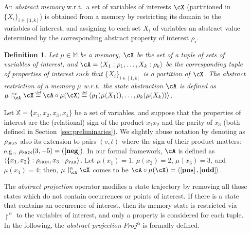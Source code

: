 \documentclass[prodmode,acmtocl]{acmsmall}
\newcommand{\caX}{\cX}
\def\variables{\ensuremath{\mathbb{X}}\xspace}
\def\memory{\ensuremath{\mu}\xspace}
\def\memories{\ensuremath{\mathbb{M}}\xspace}
\def\uco{\ensuremath{\rho}\xspace}
\def\ABSMEMop{\upharpoonright^\alpha}
\newcommand{\ABSMEM}[3]{#1 \upharpoonright^\alpha_{#3} #2}
\def\Proj{\ensuremath{\mathit{Proj}}\xspace}
\def\defi{\mbox{\raisebox{0ex}[1ex][1ex]{$\stackrel{\mbox{\tiny
def}}{\; =\;}$}}}
\def\tuple#1{\langle #1 \rangle}
\newcommand{\0}{\mbox{\bf 0}}
\newtheorem{mydefinition}[theorem]{Definition}
\def\PARDOM{\ensuremath{\uco_{\textsc{par}}}\xspace}
\def\ODD{\ABSVAL{odd}}
\def\SIGNDOM{\ensuremath{\uco_{\textsc{sign}}}\xspace}
\def\POS{\ABSVAL{pos}}
\def\NEG{\ABSVAL{neg}}
\newcommand{\ABSVAL}[1]{\left[\mathbf{#1}\right]}
\begin{document}
An \emph{abstract memory} w.r.t.\ a set of variables of interests
$\cX$ (partitioned in $\{X_i\}_{i\in[1,k]}$) is obtained from a memory
by restricting its domain to the variables of interest, and assigning
to each set $X_i$ of variables an abstract value determined by the
corresponding abstract property of interest $\uco_i$.

\begin{mydefinition}
  \label{def:AbstractStateRestriction} Let $\memory\!\in\!\memories$
  be a memory, $\cX$ be the set of 
  a tuple of sets of variables of interest, and $\cA =
  \tuple{X_1:\uco_{1},\ldots,X_k:\uco_{k}}$ be the corresponding tuple
  of properties of interest such that $\{X_i\}_{i\in[1,k]}$ is a
  partition of $\cX$.  The \emph{abstract restriction} of a memory
  $\memory$ w.r.t.~the state abstraction $\cA$ is defined as
  $\ABSMEM{\memory}{\caX}{\cA} \defi \cA \circ \memory(\caX) \defi
  \tuple{\uco_{1}(\memory(X_{1})),\ldots, \uco_{k}(\memory(X_{k}))}$.
\end{mydefinition}

\begin{example}
  \label{ex:Var}
  Let $\variables = \{x_1, x_2, x_3, x_4\}$ be a set of variables, and
  suppose that the properties of interest are the (relational) sign of the product
  $x_1 x_2$ and the parity of $x_3$ (both defined in
  Section~\ref{sec:preliminaries}).
We slightly abuse notation by denoting as $\SIGNDOM$
  also its extension to pairs $(v,t)$ where the sign of their product
  matters: e.g., $\SIGNDOM(3,-5)=(\NEG)$.  In our formal
  framework, $\cA$ is defined as
  $\tuple{\{x_1,x_2\}:\SIGNDOM, x_3:\PARDOM}$.  Let
  $\memory(x_1) = 1$, $\memory(x_2) = 2$, $\memory(x_3) = 3$, and
  $\memory(x_4) = 4$; then, $\ABSMEM{\memory}{\caX}{\cA}$ comes to be
  $\cA \circ \memory(\caX) = \langle \POS, \ODD \rangle$.
\end{example}

The \emph{abstract projection} operator modifies a state trajectory by
removing all those states which do not contain occurrences or points
of interest.  If there is a state that contains an occurrence of
interest, then its memory state is restricted via $\ABSMEMop$ to the
variables of interest, and only a property is considered for each
tuple.  In the following, the \emph{abstract projection}
$\Proj^\alpha$ is formally defined.
\end{document}
